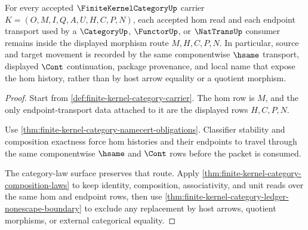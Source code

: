 \begin{theorem}
\label{thm:finite-kernel-category-morphism-route-stability}
For every accepted $\FiniteKernelCategoryUp$ carrier
$K=(O,M,I,Q,A,U,H,C,P,N)$, each accepted hom read and each endpoint transport
used by a $\CategoryUp$, $\FunctorUp$, or $\NatTransUp$ consumer remains inside
the displayed morphism route $M,H,C,P,N$. In particular, source and target
movement is recorded by the same componentwise $\hsame$ transport, displayed
$\Cont$ continuation, package provenance, and local name that expose the hom
history, rather than by host arrow equality or a quotient morphism.
\end{theorem}
\begin{proof}
Start from \autoref{def:finite-kernel-category-carrier}. The hom row is $M$,
and the only endpoint-transport data attached to it are the displayed rows
$H,C,P,N$.

Use \autoref{thm:finite-kernel-category-namecert-obligations}. Classifier
stability and composition exactness force hom histories and their endpoints to
travel through the same componentwise $\hsame$ and $\Cont$ rows before the
packet is consumed.

The category-law surface preserves that route. Apply
\autoref{thm:finite-kernel-category-composition-laws} to keep identity,
composition, associativity, and unit reads over the same hom and endpoint
rows, then use \autoref{thm:finite-kernel-category-ledger-nonescape-boundary}
to exclude any replacement by host arrows, quotient morphisms, or external
categorical equality.
\end{proof}

